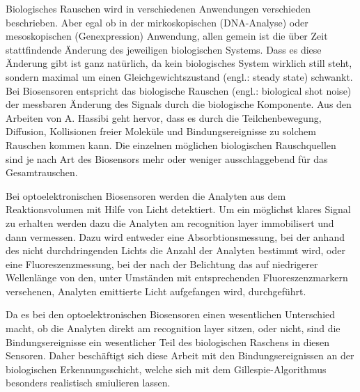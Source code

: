 Biologisches Rauschen wird in verschiedenen Anwendungen verschieden beschrieben. Aber egal ob in der mirkoskopischen (DNA-Analyse) oder mesoskopischen (Genexpression) Anwendung, allen gemein ist die über Zeit stattfindende Änderung des jeweiligen biologischen Systems. Dass es diese Änderung gibt ist ganz natürlich, da kein biologisches System wirklich still steht, sondern maximal um einen Gleichgewichtszustand (engl.: steady state) schwankt.\newline
Bei Biosensoren entspricht das biologische Rauschen (engl.: biological shot noise) der messbaren Änderung des Signals durch die biologische Komponente. Aus den Arbeiten von A. Hassibi geht hervor, dass es durch die Teilchenbewegung, Diffusion, Kollisionen freier Moleküle und Bindungsereignisse zu solchem Rauschen kommen kann.\cite{biological_shot-noise_and_SNR_in_affinity-based_biosensors} Die einzelnen möglichen biologischen Rauschquellen sind je nach Art des Biosensors mehr oder weniger ausschlaggebend für das Gesamtrauschen.\par

Bei optoelektronischen Biosensoren werden die Analyten aus dem Reaktionsvolumen mit Hilfe von Licht detektiert. Um ein möglichst klares Signal zu erhalten werden dazu die Analyten am recognition layer immobilisert und dann vermessen. Dazu wird entweder eine Absorbtionsmessung, bei der anhand des nicht durchdringenden Lichts die Anzahl der Analyten bestimmt wird, oder eine Fluoreszenzmessung\cite{AfullyintegratedCMOSfluorescencebiochip}, bei der nach der Belichtung das auf niedrigerer Wellenlänge von den, unter Umständen mit entsprechenden Fluoreszenzmarkern versehenen, Analyten emittierte Licht aufgefangen wird, durchgeführt.\par

Da es bei den optoelektronischen Biosensoren einen wesentlichen Unterschied macht, ob die Analyten direkt am recognition layer sitzen, oder nicht, sind die Bindungsereignisse ein wesentlicher Teil des biologischen Raschens in diesen Sensoren. Daher beschäftigt sich diese Arbeit mit den Bindungsereignissen an der biologischen Erkennungsschicht, welche sich mit dem Gillespie-Algorithmus besonders realistisch smiulieren lassen.\par
